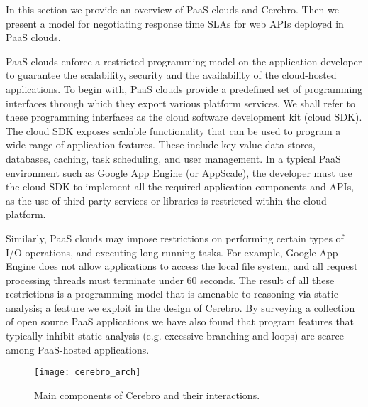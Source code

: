 In this section we provide an overview of PaaS clouds and Cerebro. Then we present a model for 
negotiating response time SLAs for web APIs deployed in PaaS clouds.

PaaS clouds enforce a restricted programming model on the application developer to guarantee
the scalability, security and the availability of the cloud-hosted applications. To begin with,
PaaS clouds provide a predefined set of programming interfaces through which they export 
various platform services. We shall refer to these programming interfaces as the cloud software
development kit (cloud SDK). The cloud SDK exposes scalable functionality that can be used to 
program a wide range of application features. These include key-value data stores, databases, 
caching, task scheduling, and user management. In a typical PaaS environment
such as Google App Engine (or AppScale), the developer must use the cloud SDK to implement
all the required application components and APIs, as the use of third party services or libraries is
restricted within the cloud platform. 

Similarly, PaaS clouds may impose restrictions on performing
certain types of I/O operations, and executing long running tasks. For example, Google App Engine
does not allow applications to access the local file system, and all request processing threads must
terminate under 60 seconds. The result of all these restrictions is a programming model that is
amenable to reasoning via static analysis; a feature we exploit in the design of Cerebro. By surveying
a collection of open source PaaS applications we have also found that program features that typically
inhibit static analysis (e.g. excessive branching and loops) are scarce among PaaS-hosted
applications.

\begin{figure}
\centering
\texttt{[image: cerebro\_arch]}
\caption{Main components of Cerebro and their interactions.}
\label{fig:cerebro_arch}
\vspace{-0.2in}
\end{figure}